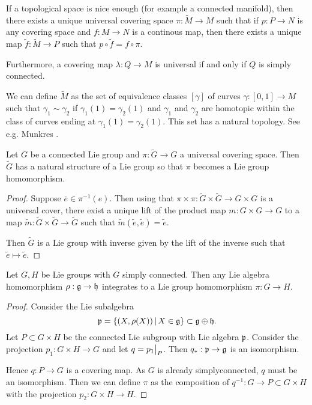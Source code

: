 \documentclass[11pt, english]{article}
\begin{document}
If a topological space is nice enough (for example a connected manifold), then there exists a unique universal covering space $\pi:\widetilde M \to M$ such that if $p:P \to N$ is any covering space and $f:M \to N$ is a continous map, then there exists a unique map $\widetilde f: \widetilde M \to P$ such that $p \circ \widetilde f = f \circ \pi$.

Furthermore, a covering map $\lambda: Q \to M$ is universal if and only if $Q$ is simply connected. 

We can define $\widetilde M$ as the set of equivalence classes $[\gamma]$ of curves $\gamma:[0,1] \to M$ such that $\gamma_1 \sim \gamma_2$  if $\gamma_1(1)=\gamma_2(1)$ and $\gamma_1$ and $\gamma_2$ are homotopic within the class of  curves ending at $\gamma_1(1)=\gamma_2(1)$. This set has a natural topology. See e.g. Munkres \cite{hatcher_algtop}.

\begin{prop}
Let $G$ be a connected Lie group and $\pi: \widetilde G \to G$ a universal covering space. Then $\widetilde G$ has a natural structure of a Lie group so that $\pi$ becomes a Lie group homomorphism.
\end{prop}

\begin{proof}
  Suppose $\overline e \in \pi^{-1}(e)$. Then using that $\pi \times \pi: \widetilde G \times \widetilde G \to G \times G$ is a universal cover, there exist a unique lift of the product map $m: G \times G \to G$ to a map $\widetilde m: \widetilde G \times \widetilde G \to \widetilde G$ such that $\widetilde m (\widetilde e, \widetilde e) = \widetilde e$.

Then $\widetilde G$ is a Lie group with inverse given by the lift of the inverse such that $\widetilde e \mapsto \widetilde e$.
\end{proof}

\begin{thm}
\label{thmsimply}
  Let $G,H$ be Lie groups with $G$ simply connected. Then any Lie algebra homomorphism $\rho:\mathfrak g \to \mathfrak h$ integrates to a Lie group homomorphism $\pi:G \to H$.
\end{thm}

\begin{proof}
  Consider the Lie subalgebra
$$
\mathfrak{p} = \{ (X,\rho(X)) \, | \, X \in \mathfrak g \} \subset \mathfrak g \oplus \mathfrak h.
$$
Let $P \subset G \times H$ be the connected Lie subgroup with Lie algebra $\mathfrak{p}$. Consider the projection $p_1: G \times H \to G$ and let $q = \restr{p_1}{P}$. Then $q_\ast : \mathfrak{p} \to \mathfrak g$ is an isomorphism. 

Hence $q:P \to G$ is a covering map. As $G$ is already simplyconnected, $q$ must be an isomorphism. Then we can define $\pi$ as the composition of $q^{-1}:G \to P \subset G \times H$ with the projection $p_2:G \times H \to H$.
\end{proof}
\end{document}
